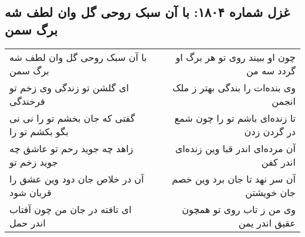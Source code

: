 \begin{center}
\section*{غزل شماره ۱۸۰۴: با آن سبک روحی گل وان لطف شه برگ سمن}
\label{sec:1804}
\begin{longtable}{l p{0.5cm} r}
با آن سبک روحی گل وان لطف شه برگ سمن
&&
چون او ببیند روی تو هر برگ او گردد سه من
\\
ای گلشن تو زندگی وی زخم تو فرخندگی
&&
وی بنده‌ات را بندگی بهتر ز ملک انجمن
\\
گفتی که جان بخشم تو را نی نی بگو بکشم تو را
&&
تا زنده‌ای باشم تو را چون شمع در گردن زدن
\\
زاهد چه جوید رحم تو عاشق چه جوید زخم تو
&&
آن مرده‌ای اندر قبا وین زنده‌ای اندر کفن
\\
آن در خلاص جان دود وین عشق را قربان شود
&&
آن سر نهد تا جان برد وین خصم جان خویشتن
\\
ای تافته در جان من چون آفتاب اندر حمل
&&
وی من ز تاب روی تو همچون عقیق اندر یمن
\\
\end{longtable}
\end{center}
